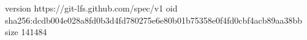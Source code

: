 version https://git-lfs.github.com/spec/v1
oid sha256:dcdb004e028a8fd0b3d4fd780275e6e80b01b75358e0f4fd0cbf4acb89aa38bb
size 141484
